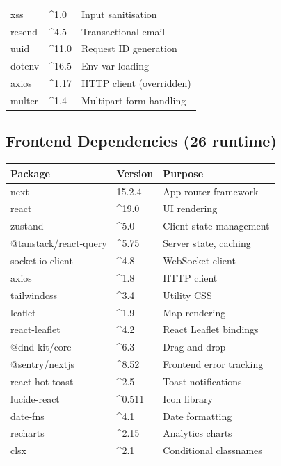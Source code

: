 \documentclass[11pt,a4paper,twoside]{book}
\newcommand{\th}[1]{\textbf{\color{white}#1}}
\begin{document}
\begin{center}
\begin{tabular}{p{4.5cm}p{3.5cm}p{4.5cm}}
\rowcolor{rowalt}xss                   & \^{}1.0          & Input sanitisation \\
resend                & \^{}4.5          & Transactional email \\
\rowcolor{rowalt}uuid                  & \^{}11.0         & Request ID generation \\
dotenv                & \^{}16.5         & Env var loading \\
\rowcolor{rowalt}axios                 & \^{}1.17         & HTTP client (overridden) \\
multer                & \^{}1.4          & Multipart form handling \\
\bottomrule
\end{tabular}
\end{center}

\subsection{Frontend Dependencies (26 runtime)}

\begin{center}\footnotesize
\begin{tabular}{p{4.5cm}p{3cm}p{5cm}}
\toprule
\rowcolor{headbg}\th{Package} & \th{Version} & \th{Purpose} \\
\midrule
next                  & 15.2.4       & App router framework \\
\rowcolor{rowalt}react                 & \^{}19.0        & UI rendering \\
zustand               & \^{}5.0         & Client state management \\
\rowcolor{rowalt}@tanstack/react-query & \^{}5.75        & Server state, caching \\
socket.io-client      & \^{}4.8         & WebSocket client \\
\rowcolor{rowalt}axios                 & \^{}1.8         & HTTP client \\
tailwindcss           & \^{}3.4         & Utility CSS \\
\rowcolor{rowalt}leaflet               & \^{}1.9         & Map rendering \\
react-leaflet         & \^{}4.2         & React Leaflet bindings \\
\rowcolor{rowalt}@dnd-kit/core         & \^{}6.3         & Drag-and-drop \\
@sentry/nextjs        & \^{}8.52        & Frontend error tracking \\
\rowcolor{rowalt}react-hot-toast       & \^{}2.5         & Toast notifications \\
lucide-react          & \^{}0.511       & Icon library \\
\rowcolor{rowalt}date-fns              & \^{}4.1         & Date formatting \\
recharts              & \^{}2.15        & Analytics charts \\
\rowcolor{rowalt}clsx                  & \^{}2.1         & Conditional classnames \\
\bottomrule
\end{tabular}
\end{center}
\end{document}
